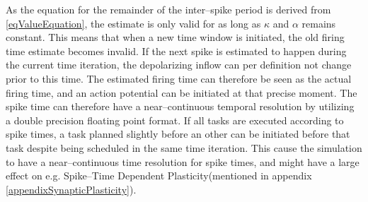 	As the equation for the remainder of the inter--spike period is derived from \eqref{eqValueEquation}, the estimate is only valid for as long as $\kappa$ and $\alpha$ remains constant.
	This means that when a new time window is initiated, the old firing time estimate becomes invalid.
	If the next spike is estimated to happen during the current time iteration, the depolarizing inflow can per definition not change prior to this time. 
	The estimated firing time can therefore be seen as the actual firing time, and an action potential can be initiated at that precise moment.
	The spike time can therefore have a near--continuous temporal resolution by utilizing a double precision floating point format. 
	If all tasks are executed according to spike times, a task planned slightly before an other can be initiated before that task despite being scheduled in the same time iteration.
	This cause the simulation to have a near--continuous time resolution for spike times, and might have a large effect on e.g. Spike--Time Dependent Plasticity(mentioned in appendix \ref{appendixSynapticPlasticity}).


